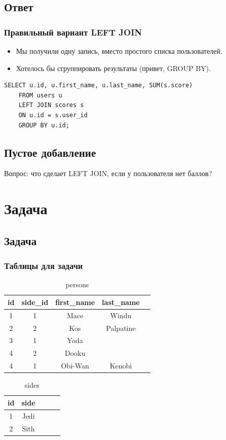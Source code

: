 \documentclass[compress,red]{beamer}
\begin{document}
\subsection{Ответ}
\begin{frame}[fragile]
  \frametitle{Правильный вариант LEFT JOIN}
  \begin{itemize}
    \item Мы получили одну запись, вместо простого списка пользователей.
    \item Хотелось бы сгруппировать результаты (привет, GROUP BY).
  \end{itemize}
  \scriptsize{
  \begin{lstlisting}[label=sql5,caption=LEFT JOIN GROUP BY]
    SELECT u.id, u.first_name, u.last_name, SUM(s.score) 
    FROM users u 
    LEFT JOIN scores s
    ON u.id = s.user_id
    GROUP BY u.id;
  \end{lstlisting}
  }
\end{frame}

\subsection{Пустое добавление}
\begin{frame}
  \begin{center}
    \Large{Вопрос: что сделает LEFT JOIN, если у пользователя нет баллов?}
  \end{center}
\end{frame}

\section{Задача}
\subsection{Задача}
\begin{frame}[fragile]
  \frametitle{Таблицы для задачи}
  \begin{table}
    \begin{tabular}{|c|c|c|c|c|}
      \hline
      id & side\_id & first\_name & last\_name \\
      \hline
      1 & 1 & Mace & Windu \\
      2 & 2 & Kos & Palpatine\\
      3 & 1 & Yoda &  \\
      4 & 2 & Dooku &  \\
      4 & 1 & Obi-Wan & Kenobi  \\
      \hline
    \end{tabular}
    \caption{persons}
  \end{table}
  \begin{table}
    \begin{tabular}{|c|c|c|c|c|}
      \hline
      id & side \\
      \hline
      1 & Jedi \\
      2 & Sith \\
      \hline
    \end{tabular}
    \caption{sides}
  \end{table}
\end{frame}
\end{document}
